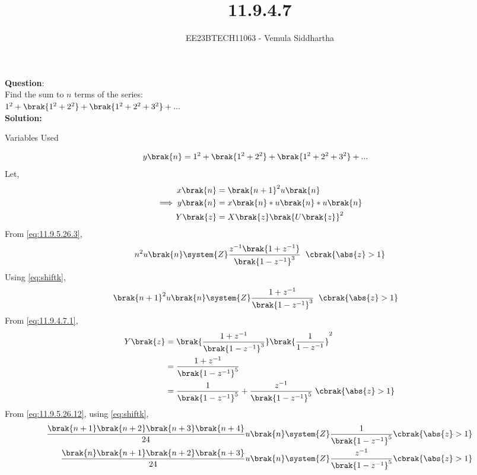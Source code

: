 \documentclass[journal,12pt,twocolumn]{IEEEtran}
\theoremstyle{remark}
\begin{document}

\vspace{3cm}

\title{11.9.4.7}
\author{EE23BTECH11063 - Vemula Siddhartha
}
\maketitle
\newpage
\bigskip

\renewcommand{\thefigure}{\theenumi}
\renewcommand{\thetable}{\theenumi}
\textbf{Question}:\\
Find the sum to $n$ terms of the series:\\
    $1^2+\brak{1^2+2^2}+\brak{1^2+2^2+3^2}+...$
    \\
\textbf{Solution:}
\fi
\begin{table}[h!]    
    \centering
    
    \caption{Variables Used}
    \label{tab:11.9.4.7.1}
  \end{table}
\begin{align}
    y\brak{n}&=1^2+\brak{1^2+2^2}+\brak{1^2+2^2+3^2}+...
\end{align}
Let,
\begin{align}
    x\brak{n}&=\brak{n+1}^2u\brak{n}\\
    \implies y\brak{n}&=x\brak{n}*u\brak{n}*u\brak{n}\\
    Y\brak{z}&=X\brak{z}\brak{U\brak{z}}^2
\end{align}
From \eqref{eq:11.9.5.26.3},
\begin{align}
    n^2u\brak{n}\system{Z}\frac{z^{-1}\brak{1+z^{-1}}}{\brak{1-z^{-1}}^3}\;\;\cbrak{\abs{z}>1}
\end{align}
Using \eqref{eq:shiftk},
\begin{align}
    \brak{n+1}^2u\brak{n}&\system{Z}\frac{1+z^{-1}}{\brak{1-z^{-1}}^3}\;\;\cbrak{\abs{z}>1}\label{eq:11.9.4.7.1}
\end{align}
From \eqref{eq:11.9.4.7.1},
\begin{align}
    Y\brak{z}&=\brak{\frac{1+z^{-1}}{\brak{1-z^{-1}}^3}}\brak{\frac{1}{1-z^{-1}}}^2\\
    &=\frac{1+z^{-1}}{\brak{1-z^{-1}}^5}\\
    &=\frac{1}{\brak{1-z^{-1}}^5}+\frac{z^{-1}}{\brak{1-z^{-1}}^5}\;\cbrak{\abs{z}>1}
\end{align}
From \eqref{eq:11.9.5.26.12}, using \eqref{eq:shiftk},
\begin{align}
    \frac{\brak{n+1}\brak{n+2}\brak{n+3}\brak{n+4}}{24}u\brak{n}&\system{Z}\frac{1}{\brak{1-z^{-1}}^5}\label{eq:11.9.4.7.2}\cbrak{\abs{z}>1}\\
    \frac{\brak{n}\brak{n+1}\brak{n+2}\brak{n+3}}{24}u\brak{n}&\system{Z}\frac{z^{-1}}{\brak{1-z^{-1}}^5}\label{eq:11.9.4.7.3}\cbrak{\abs{z}>1}
\end{align}
\end{document}
